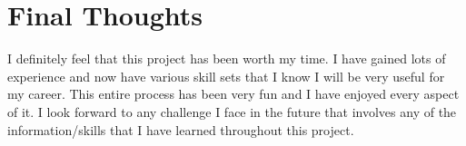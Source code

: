 \section{Final Thoughts}

I definitely feel that this project has been worth my time. I have gained lots of experience and now have various skill sets that I know I will be very useful for my career. This entire process has been very fun and I have enjoyed every aspect of it. I look forward to any challenge I face in the future that involves any of the information/skills that I have learned throughout this project.